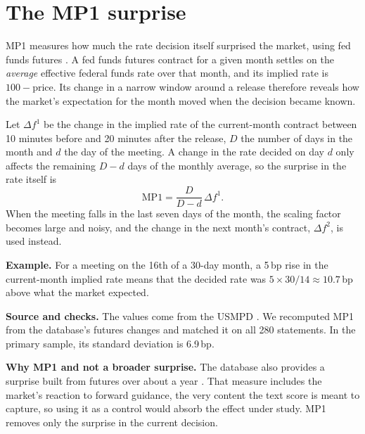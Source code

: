 \documentclass[11pt,a4paper]{article}
\newcommand{\sfb}[1]{{\sffamily\bfseries #1}}
\newcommand{\bp}{\,bp}
\begin{document}
\appendix
\section{The MP1 surprise}
\label{app:mp1}

MP1 measures how much the rate decision itself surprised the market, using fed funds futures
\citep{kuttner2001}. A fed funds futures contract for a given month settles on the
\emph{average} effective federal funds rate over that month, and its implied rate is
$100 - \text{price}$. Its change in a narrow window around a release therefore reveals how the
market's expectation for the month moved when the decision became known.

Let $\Delta f^{1}$ be the change in the implied rate of the current-month contract between 10
minutes before and 20 minutes after the release, $D$ the number of days in the month and $d$
the day of the meeting. A change in the rate decided on day $d$ only affects the remaining
$D - d$ days of the monthly average, so the surprise in the rate itself is
\[
  \mathrm{MP1} = \frac{D}{D - d}\,\Delta f^{1} .
\]
When the meeting falls in the last seven days of the month, the scaling factor becomes large
and noisy, and the change in the next month's contract, $\Delta f^{2}$, is used instead.

\sfb{Example.} For a meeting on the 16th of a 30-day month, a 5\bp{} rise in the current-month
implied rate means that the decided rate was $5 \times 30/14 \approx 10.7$\bp{} above what the
market expected.

\sfb{Source and checks.} The values come from the USMPD \citep{acosta2025}. We recomputed MP1 from
the database's futures changes and matched it on all 280 statements. In the primary sample, its
standard deviation is 6.9\bp{}.

\sfb{Why MP1 and not a broader surprise.} The database also provides a surprise built from
futures over about a year \citep{ns2018}. That measure includes the market's reaction to forward
guidance, the very content the text score is meant to capture, so using it as a control would
absorb the effect under study. MP1 removes only the surprise in the current decision.
\end{document}
